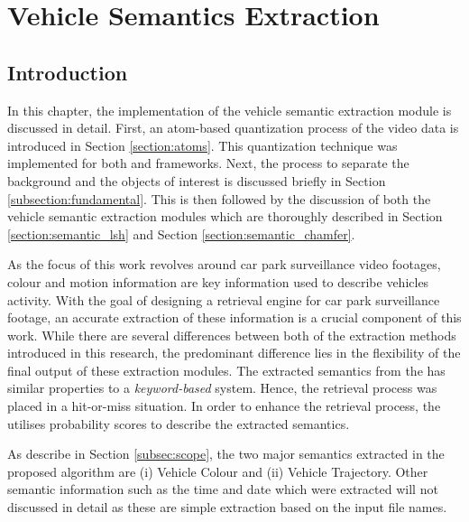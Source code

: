 \chapter{Vehicle Semantics Extraction}

\label{section:semanticsextraction}


\section{Introduction}

In this chapter, the implementation of the vehicle semantic extraction module is discussed in detail. 
First, an atom-based quantization process of the video data is introduced in Section \ref{section:atoms}. This quantization technique was implemented for both \versionOneExt and \versionTwoExt frameworks. Next, the process to separate the background and the objects of interest is discussed briefly in Section \ref{subsection:fundamental}. 
This is then followed by the discussion of both the vehicle semantic extraction modules which are thoroughly described in Section \ref{section:semantic_lsh} and Section \ref{section:semantic_chamfer}.


As the focus of this work revolves around car park surveillance video footages, colour and motion information are key information used to describe vehicles activity. With the goal of designing a retrieval engine for car park surveillance footage, an accurate extraction of these information is a crucial component of this work. 
While there are several differences between both of the extraction methods introduced in this research, the predominant difference lies in the flexibility of the final output of these extraction modules.
The extracted semantics from the \versionOneExt has similar properties to a \textit{keyword-based} system. Hence, the retrieval process was placed in a hit-or-miss situation. In order to enhance the retrieval process, the \versionTwoExt utilises probability scores to describe the extracted semantics.


As describe in Section \ref{subsec:scope}, the two major semantics extracted in the proposed algorithm are (i) Vehicle Colour and (ii) Vehicle Trajectory. Other semantic information such as the time and date which were extracted will not discussed in detail as these are simple extraction based on the input file names.



